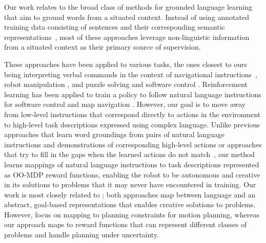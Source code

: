 \documentclass[conference]{IEEEtran}
\begin{document}

Our work relates to the broad class of methods for grounded language learning that aim to ground words from a situated context.
Instead of using annotated training data consisting of sentences and their corresponding semantic representations~\cite{kate06,wong07,zettlemoyer05,zettlemoyer09}, 
most of these approaches leverage non-linguistic information from a situated context as their primary source of supervision. 

These approaches have been applied to various tasks, the ones  closest to ours being interpreting verbal commands in the context of navigational instructions~\cite{vogel10,chen11,grubb11}, robot manipulation \cite{duvallet2013,tellex14,howard14},
and puzzle solving and software control \cite{bkr10}.
 Reinforcement learning has been applied to train a policy to follow natural language instructions for software control
and map navigation \cite{vogel10}. However, our goal is to move away from low-level instructions that correspond directly to actions in the environment
to high-level task descriptions expressed using complex language.
Unlike previous approaches that learn word groundings from pairs of
natural language instructions and demonstrations of corresponding high-level
actions \cite{tellex14,duvallet2013} or approaches that try to fill
in the gaps when the learned actions do not match~\cite{misra14}, 
our method learns mappings
of natural language instructions to task descriptions represented as
OO-MDP reward functions, enabling the robot to be autonomous and creative
in its solutions to problems that it may never have encountered
in training.  
Our work is most closely related to \citet{howard14}; both approaches map
between language and an abstract, goal-based representations that
enables creative solutions to problems. However, \citeauthor{howard14}
focus on mapping to planning constraints for motion planning, whereas our 
approach maps to reward functions that can represent different classes
of problems and handle planning under uncertainty.
\end{document}
